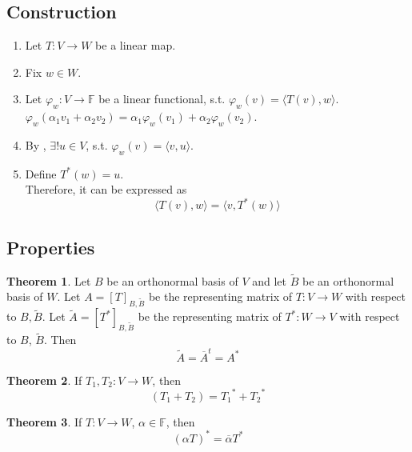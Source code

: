 \documentclass[fleqn, a4paper, 12pt]{article}
\theoremstyle{definition}
\theoremstyle{theorem}
\newtheorem{theorem}{Theorem} %
\theoremstyle{remark}
\numberwithin{corollary}{theorem}
\numberwithin{equation}{theorem}
\begin{document}
\subsection{Construction}

\begin{enumerate}
	\item Let $T : V \to W$ be a linear map.
	\item Fix $w \in W$.
	\item Let $\varphi_w : V \to \mathbb{F}$ be a linear functional, s.t. $\varphi_w(v) = \langle T(v), w \rangle$.\\
	$\varphi_w(\alpha_1 v_1 + \alpha_2 v_2) = \alpha_1 \varphi_w(v_1) + \alpha_2 \varphi_w(v_2)$.
	\item By , $\exists ! u \in V$, s.t. $\varphi_w(v) = \langle v, u \rangle$.
	\item Define $T^*(w) = u$.\\
	Therefore, it can be expressed as 
	\begin{equation*}
		\langle T(v), w \rangle = \langle v, T^*(w) \rangle
	\end{equation*}
\end{enumerate}

\subsection{Properties}

\begin{theorem}
	Let $B$ be an orthonormal basis of $V$ and let $\tilde{B}$ be an orthonormal basis of $W$. Let $A = [T]_{B, \tilde{B}}$ be the representing matrix of $T : V \to W$ with respect to $B, \tilde{B}$. Let $\tilde{A} = [T^*]_{B, \tilde{B}}$ be the representing matrix of $T^* : W \to V$ with respect to $B$, $\tilde{B}$. Then
		\begin{equation*}
			\tilde{A} = \overline{A}^t = A^*
		\end{equation*}
\end{theorem}

\begin{theorem}
	If $T_1, T_2 : V \to W$, then
	\begin{equation*}
		\left( T_1 + T_2 \right) = {T_1}^* + {T_2}^*
	\end{equation*}
\end{theorem}

\begin{theorem}
	If $T : V \to W$, $\alpha \in \mathbb{F}$, then
	\begin{equation*}
		(\alpha T)^* = \overline{\alpha} T^*
	\end{equation*}
\end{theorem}
\end{document}
